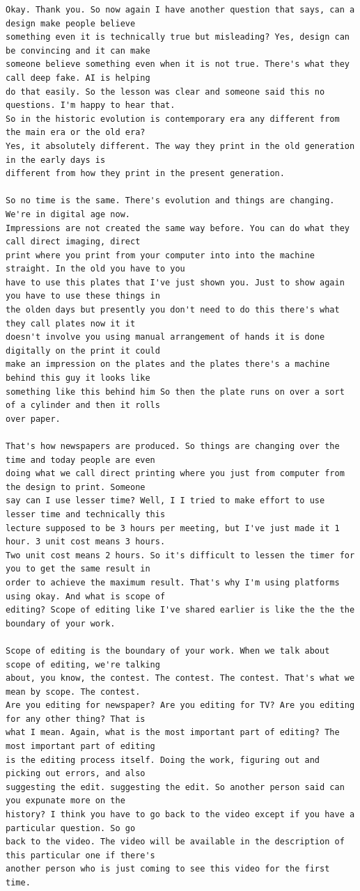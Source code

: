 {\begin{Verbatim}
Okay. Thank you. So now again I have another question that says, can a design make people believe
something even it is technically true but misleading? Yes, design can be convincing and it can make
someone believe something even when it is not true. There's what they call deep fake. AI is helping
do that easily. So the lesson was clear and someone said this no questions. I'm happy to hear that.
So in the historic evolution is contemporary era any different from the main era or the old era?
Yes, it absolutely different. The way they print in the old generation in the early days is
different from how they print in the present generation.

So no time is the same. There's evolution and things are changing. We're in digital age now.
Impressions are not created the same way before. You can do what they call direct imaging, direct
print where you print from your computer into into the machine straight. In the old you have to you
have to use this plates that I've just shown you. Just to show again you have to use these things in
the olden days but presently you don't need to do this there's what they call plates now it it
doesn't involve you using manual arrangement of hands it is done digitally on the print it could
make an impression on the plates and the plates there's a machine behind this guy it looks like
something like this behind him So then the plate runs on over a sort of a cylinder and then it rolls
over paper.

That's how newspapers are produced. So things are changing over the time and today people are even
doing what we call direct printing where you just from computer from the design to print. Someone
say can I use lesser time? Well, I I tried to make effort to use lesser time and technically this
lecture supposed to be 3 hours per meeting, but I've just made it 1 hour. 3 unit cost means 3 hours.
Two unit cost means 2 hours. So it's difficult to lessen the timer for you to get the same result in
order to achieve the maximum result. That's why I'm using platforms using okay. And what is scope of
editing? Scope of editing like I've shared earlier is like the the the boundary of your work.

Scope of editing is the boundary of your work. When we talk about scope of editing, we're talking
about, you know, the contest. The contest. The contest. That's what we mean by scope. The contest.
Are you editing for newspaper? Are you editing for TV? Are you editing for any other thing? That is
what I mean. Again, what is the most important part of editing? The most important part of editing
is the editing process itself. Doing the work, figuring out and picking out errors, and also
suggesting the edit. suggesting the edit. So another person said can you expunate more on the
history? I think you have to go back to the video except if you have a particular question. So go
back to the video. The video will be available in the description of this particular one if there's
another person who is just coming to see this video for the first time.


\end{Verbatim}}
